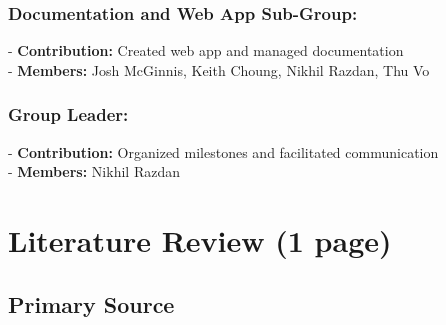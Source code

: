 \documentclass{article}
\begin{document}
\subsubsection*{Documentation and Web App Sub-Group:}
- \textbf{Contribution:} Created web app and managed documentation \\
- \textbf{Members:} Josh McGinnis, Keith Choung, Nikhil Razdan, Thu Vo
\subsubsection*{Group Leader:}
- \textbf{Contribution:} Organized milestones and facilitated communication \\
- \textbf{Members:} Nikhil Razdan

\section*{Literature Review (1 page)}
\subsection*{Primary Source}
\end{document}
